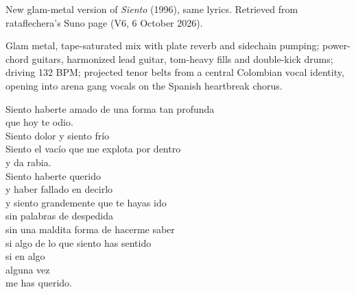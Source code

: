 
\begin{notes}
New glam-metal version of \emph{Siento} (1996), same lyrics. Retrieved from rataflechera's Suno page (V6, 6 October 2026).
\end{notes}
\begin{style}
Glam metal, tape-saturated mix with plate reverb and sidechain pumping; power-chord guitars, harmonized lead guitar, tom-heavy fills and double-kick drums; driving 132 BPM; projected tenor belts from a central Colombian vocal identity, opening into arena gang vocals on the Spanish heartbreak chorus.
\end{style}
\begin{lyrics}
Siento haberte amado de una forma tan profunda\\
que hoy te odio.\\
Siento dolor y siento frío\\
Siento el vacío que me explota por dentro\\
y da rabia.\\
Siento haberte querido\\
y haber fallado en decirlo\\
y siento grandemente que te hayas ido\\
sin palabras de despedida\\
sin una maldita forma de hacerme saber\\
si algo de lo que siento has sentido\\
si en algo\\
alguna vez\\
me has querido.
\end{lyrics}

